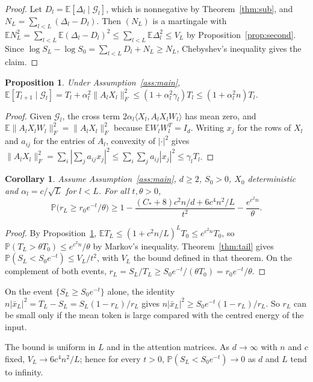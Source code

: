 \documentclass[11pt]{amsart}
\newtheorem{proposition}[theorem]{Proposition}
\newtheorem{corollary}[theorem]{Corollary}
\theoremstyle{definition}
\theoremstyle{remark}
\numberwithin{equation}{section}
\newcommand{\EE}{\mathbb{E}}
\newcommand{\PP}{\mathbb{P}}
\newcommand{\cG}{\mathcal{G}}
\begin{document}
\begin{proof}
Let $D_l=\EE[\Delta_l\mid\cG_l]$, which is nonnegative by Theorem~\ref{thm:sub}, and $N_L=\sum_{l<L}(\Delta_l-D_l)$. Then $(N_L)$ is a martingale with $\EE N_L^2=\sum_{l<L}\EE(\Delta_l-D_l)^2\le\sum_{l<L}\EE\Delta_l^2\le V_L$ by Proposition~\ref{prop:second}. Since $\log S_L-\log S_0=\sum_{l<L}D_l+N_L\ge N_L$, Chebyshev's inequality gives the claim.
\end{proof}

\begin{proposition}\label{prop:energy}
Under Assumption~\ref{ass:main}, $\EE[T_{l+1}\mid\cG_l]=T_l+\alpha_l^2\|A_lX_l\|_F^2\le(1+\alpha_l^2\gamma_l)T_l\le(1+\alpha_l^2n)T_l$.
\end{proposition}

\begin{proof}
Given $\cG_l$, the cross term $2\alpha_l\langle X_l,A_lX_lW_l\rangle$ has mean zero, and $\EE\|A_lX_lW_l\|_F^2=\|A_lX_l\|_F^2$ because $\EE W_lW_l^{T}=I_d$. Writing $x_j$ for the rows of $X_l$ and $a_{ij}$ for the entries of $A_l$, convexity of $|\cdot|^2$ gives $\|A_lX_l\|_F^2=\sum_i|\sum_ja_{ij}x_j|^2\le\sum_i\sum_ja_{ij}|x_j|^2\le\gamma_lT_l$.
\end{proof}

\begin{corollary}\label{cor:scaling}
Assume Assumption~\ref{ass:main}, $d\ge2$, $S_0>0$, $X_0$ deterministic and $\alpha_l=c/\sqrt L$ for $l<L$. For all $t,\theta>0$,
\[
\PP\bigl(r_L\ge r_0e^{-t}/\theta\bigr)\ge1-\frac{(C_*+8)c^2n/d+6c^4n^2/L}{t^2}-\frac{e^{c^2n}}\theta.
\]
\end{corollary}

\begin{proof}
By Proposition~\ref{prop:energy}, $\EE T_L\le(1+c^2n/L)^LT_0\le e^{c^2n}T_0$, so $\PP(T_L>\theta T_0)\le e^{c^2n}/\theta$ by Markov's inequality. Theorem~\ref{thm:tail} gives $\PP(S_L<S_0e^{-t})\le V_L/t^2$, with $V_L$ the bound defined in that theorem. On the complement of both events, $r_L=S_L/T_L\ge S_0e^{-t}/(\theta T_0)=r_0e^{-t}/\theta$.
\end{proof}

On the event $\{S_L\ge S_0e^{-t}\}$ alone, the identity $n|\bar x_L|^2=T_L-S_L=S_L(1-r_L)/r_L$ gives $n|\bar x_L|^2\ge S_0e^{-t}(1-r_L)/r_L$. So $r_L$ can be small only if the mean token is large compared with the centred energy of the input.

The bound is uniform in $L$ and in the attention matrices. As $d\to\infty$ with $n$ and $c$ fixed, $V_L\to6c^4n^2/L$; hence for every $t>0$, $\PP(S_L<S_0e^{-t})\to0$ as $d$ and $L$ tend to infinity.
\end{document}
